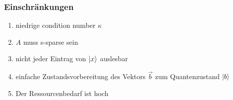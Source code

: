 \begin{frame}
    \frametitle{Einschränkungen}
    \begin{enumerate}

        \item niedrige condition number $\kappa$ 

        \hfil


        \item $A$ muss s-sparse sein

        \hfil

        \item nicht jeder Eintrag von $\ket{x}$ auslesbar

        \hfil

        \item einfache Zustandsvorbereitung des Vektors $\vec b$ zum Quantenzustand $\ket{b}$

        \hfil

        \item Der Ressourcenbedarf ist hoch
\end{enumerate} \end{frame}